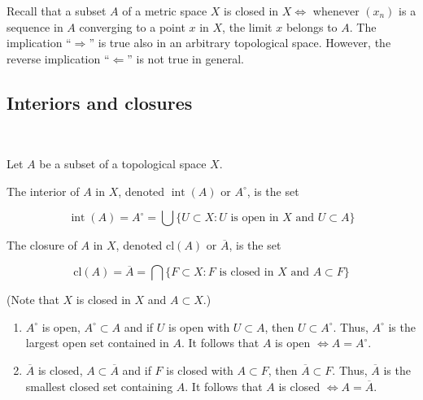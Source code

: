 \documentclass[a4paper,11pt]{article}
\begin{document}
\begin{remark}
    Recall that a subset $A$ of a metric space $X$ is closed in $X \Leftrightarrow$ whenever $\left(x_{n}\right)$ is a sequence in $A$ converging to a point $x$ in $X$, the limit $x$ belongs to $A$. The implication ``$\Rightarrow $'' is true also in an arbitrary topological space. However, the reverse implication ``$\Leftarrow$'' is not true in general.
\end{remark}

\subsection{Interiors and closures}\ \vspace{-1.5em}
\begin{definition}
    Let $A$ be a subset of a topological space $X$.

The interior of $A$ in $X$, denoted $\operatorname{int}(A)$ or $A^{\circ}$, is the set

$$
\operatorname{int}(A)=A^{\circ}=\bigcup\{U \subset X: U \text { is open in } X \text { and } U \subset A\}
$$

The closure of $A$ in $X$, denoted $\mathrm{cl}(A)$ or $\overline{A}$, is the set

$$
\mathrm{cl}(A)=\overline{A}=\bigcap\{F \subset X: F \text { is closed in } X \text { and } A \subset F\}
$$

(Note that $X$ is closed in $X$ and $A \subset X$.)
\end{definition}

\begin{remark}
    \begin{enumerate}
        \item $A^{\circ}$ is open, $A^{\circ} \subset A$ and if $U$ is open with $U \subset A$, then $U \subset A^{\circ}$. Thus, $A^{\circ}$ is the largest open set contained in $A$. It follows that $A$ is open $\Longleftrightarrow A=A^{\circ}$.
      
        \item $\overline{A}$ is closed, $A \subset \overline{A}$ and if $F$ is closed with $A \subset F$, then $\overline{A} \subset F$. Thus, $\overline{A}$ is the smallest closed set containing $A$. It follows that $A$ is closed $\Longleftrightarrow A=\overline{A}$.
      
      \end{enumerate}
\end{remark}
\end{document}
